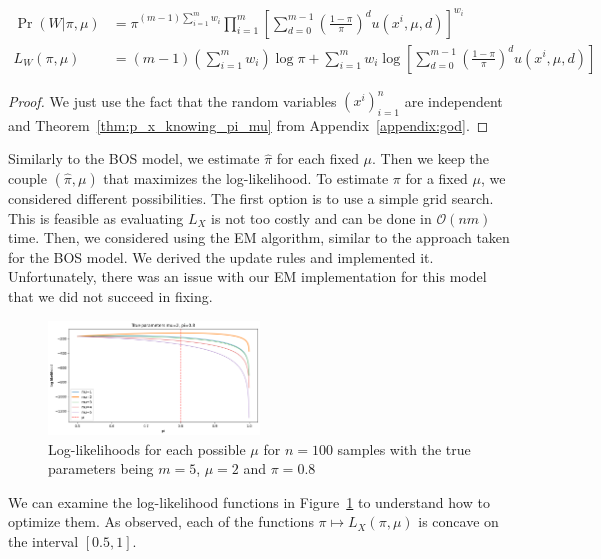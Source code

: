 \begin{thm}
    \label{thm:p_xs_knowing_pi_mu}
    \begin{align}
        \Pr(W | \pi, \mu) 
        &= \pi^{(m-1)\sum_{i=1}^{m} w_i} \prod_{i=1}^{m} \left[\sum_{d = 0}^{m-1} \left(\frac{1 - \pi}{\pi}\right)^d u(x^i, \mu, d) \right]^{w_i}\\
        L_W(\pi, \mu) 
        &= (m-1)\left(\sum_{i=1}^{m} w_i\right) \log\pi + \sum_{i=1}^{m} w_i \log\left[ \sum_{d = 0}^{m-1} \left(\frac{1 - \pi}{\pi}\right)^d u(x^i, \mu, d) \right]
    \end{align}
\end{thm}
\begin{proof}
    We just use the fact that the random variables $(x^i)_{i=1}^n$ are independent and Theorem~\ref{thm:p_x_knowing_pi_mu} from Appendix~\ref{appendix:god}.
\end{proof}

Similarly to the BOS model, we estimate $\hat{\pi}$ for each fixed $\mu$. Then we keep the couple $(\hat{\pi}, \mu)$ that maximizes the log-likelihood.
To estimate $\pi$ for a fixed $\mu$, we considered different possibilities. The first option is to use a simple grid search. This is feasible as evaluating $L_X$ is not too costly and can be done in $\mathcal O(nm)$ time. Then, we considered using the EM algorithm, similar to the approach taken for the BOS model. We derived the update rules and implemented it. Unfortunately, there was an issue with our EM implementation for this model that we did not succeed in fixing.

\begin{figure}
    \centering
    \includegraphics[width=0.5\textwidth]{Attachments/log_likelihoods.png}
    \caption{Log-likelihoods for each possible $\mu$ for $n = 100$ samples with the true parameters being $m = 5$, $\mu=2$ and $\pi = 0.8$ }
    \label{fig:log_likelihoods}
\end{figure}

We can examine the log-likelihood functions in Figure~\ref{fig:log_likelihoods} to understand how to optimize them. As observed, each of the functions $\pi \mapsto L_X(\pi, \mu)$ is concave on the interval $[0.5, 1]$.

